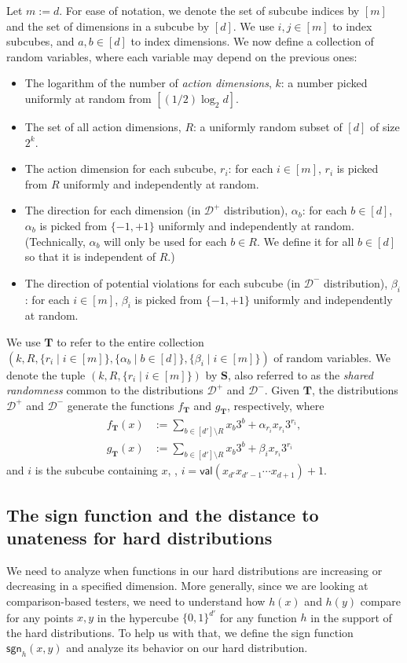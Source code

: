 \documentclass{toc}
\newcommand{\bS}{\ensuremath{\mathbf{S}}}
\newcommand{\bT}{\ensuremath{\mathbf{T}}}
\newcommand{\Yes}{\ensuremath{\mathcal{D}^+}}
\newcommand{\No}{\ensuremath{\mathcal{D}^-}}
\newcommand{\dd}{\ensuremath{{d'}}}
\newcommand{\dec}{\mathsf{val}}
\newcommand{\sgn}{\mathsf{sgn}}
\begin{document}
Let $m:=d$. For ease of notation, we denote the set of subcube indices by $[m]$ and the set of dimensions in a subcube by $[d]$.
We use $i,j\in [m]$ to index subcubes,
and $a,b\in [d]$ to index dimensions.
We now define a collection of random variables, where each variable may depend on the previous ones:
\begin{itemize}
    \item The logarithm of the number of \emph{action dimensions}, $k$: a number picked uniformly at random from $\left[({1}/{2})\log_2 d \right]$.
    \item The set of all action dimensions, $R$: a uniformly random subset of $[d]$ of size $2^k$.
    \item The action dimension for each subcube, $r_i$: for each $i \in [m]$, $r_i$ is picked from $R$ uniformly and independently at random.
    \item The direction for each dimension (in $\Yes$ distribution), $\alpha_b$: for each $b \in [d]$, $\alpha_b$ is picked from $\{-1,+1\}$ uniformly and independently at random.
    (Technically, $\alpha_b$ will only be used for each $b \in R$. We define it for all $b \in [d]$ so that it is independent of $R$.)
    \item The direction of potential violations for each subcube (in $\No$ distribution), $\beta_i$: for each $i \in [m]$, $\beta_i$ is picked from $\{-1,+1\}$ uniformly and independently at random.
\end{itemize}


We use $\bT$ to refer to the entire collection
%
%
%
%
%
$(k, R, \{r_i \mid i \in [m]\}, \{\alpha_b \mid b \in [d]\}, \{\beta_i \mid i \in [m]\})$
%
of random variables.  %
We denote the tuple $(k,R,\{r_i \mid i \in [m]\})$ by $\bS$, also referred
%
%
to as the \emph{shared randomness} common to
the  %
%
%
%
distributions $\Yes$ and $\No$.
%
Given $\bT$, the distributions $\Yes$ and $\No$ generate
the  %
functions $f_{\bT}$
and $g_{\bT}$, respectively, %
where
\begin{align*}
f_{\bT}(x) &:=  \sum_{b \in [d'] \setminus R} x_b 3^b + \alpha_{r_i} x_{r_i}3^{r_i}, %
\\
g_{\bT}(x) &:=  \sum_{b \in [d'] \setminus R} x_b 3^b + \beta_i x_{r_i}3^{r_i} %
\end{align*}
and $i$ is the subcube containing $x$, \ie, $i = \dec(x_{d'}x_{d'-1}\cdots x_{d+1}) + 1$.


%
%
%
%
%
%
%
%



\subsection{The sign function and the distance to unateness for hard distributions} \label{sec:sgn-fn}
We need to analyze when functions in our hard distributions are increasing or decreasing in a specified dimension. More generally, since we are looking at comparison-based testers, we need to understand how $h(x)$ and $h(y)$ compare for any points $x,y$ in the hypercube $\{0,1\}^{\dd}$ for any function $h$ in the support of the hard distributions. To help us with that, we define the sign function $\sgn_h(x,y)$ and analyze its behavior on our hard distribution.
\end{document}
